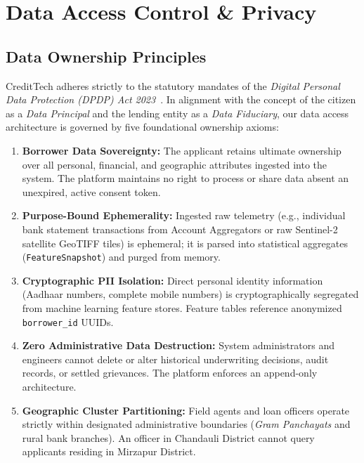 \chapter{Data Access Control \& Privacy}
\label{chap:data_access_control}

\section{Data Ownership Principles}
CreditTech adheres strictly to the statutory mandates of the \textit{Digital Personal Data Protection (DPDP) Act 2023}~\cite{dpdp_act_2023}. In alignment with the concept of the citizen as a \textit{Data Principal} and the lending entity as a \textit{Data Fiduciary}, our data access architecture is governed by five foundational ownership axioms:

\begin{enumerate}
  \item \textbf{Borrower Data Sovereignty:} The applicant retains ultimate ownership over all personal, financial, and geographic attributes ingested into the system. The platform maintains no right to process or share data absent an unexpired, active consent token.
  \item \textbf{Purpose-Bound Ephemerality:} Ingested raw telemetry (e.g., individual bank statement transactions from Account Aggregators or raw Sentinel-2 satellite GeoTIFF tiles) is ephemeral; it is parsed into statistical aggregates (\texttt{FeatureSnapshot}) and purged from memory.
  \item \textbf{Cryptographic PII Isolation:} Direct personal identity information (Aadhaar numbers, complete mobile numbers) is cryptographically segregated from machine learning feature stores. Feature tables reference anonymized \texttt{borrower\_id} UUIDs.
  \item \textbf{Zero Administrative Data Destruction:} System administrators and engineers cannot delete or alter historical underwriting decisions, audit records, or settled grievances. The platform enforces an append-only architecture.
  \item \textbf{Geographic Cluster Partitioning:} Field agents and loan officers operate strictly within designated administrative boundaries (\textit{Gram Panchayats} and rural bank branches). An officer in Chandauli District cannot query applicants residing in Mirzapur District.
\end{enumerate}

